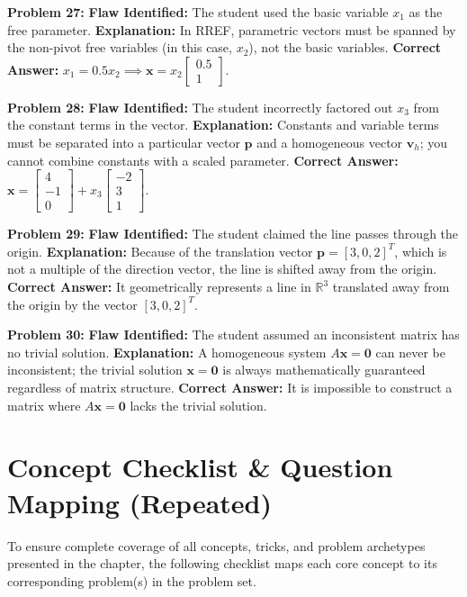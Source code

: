 \documentclass[12pt]{article}
\begin{document}
\textbf{Problem 27:}
\textbf{Flaw Identified:} The student used the basic variable $x_1$ as the free parameter.
\textbf{Explanation:} In RREF, parametric vectors must be spanned by the non-pivot free variables (in this case, $x_2$), not the basic variables.
\textbf{Correct Answer:} $x_1 = 0.5x_2 \implies \mathbf{x} = x_2 \begin{bmatrix} 0.5 \\ 1 \end{bmatrix}$.

\textbf{Problem 28:}
\textbf{Flaw Identified:} The student incorrectly factored out $x_3$ from the constant terms in the vector.
\textbf{Explanation:} Constants and variable terms must be separated into a particular vector $\mathbf{p}$ and a homogeneous vector $\mathbf{v}_h$; you cannot combine constants with a scaled parameter.
\textbf{Correct Answer:} $\mathbf{x} = \begin{bmatrix} 4 \\ -1 \\ 0 \end{bmatrix} + x_3 \begin{bmatrix} -2 \\ 3 \\ 1 \end{bmatrix}$.

\textbf{Problem 29:}
\textbf{Flaw Identified:} The student claimed the line passes through the origin.
\textbf{Explanation:} Because of the translation vector $\mathbf{p} = [3, 0, 2]^T$, which is not a multiple of the direction vector, the line is shifted away from the origin.
\textbf{Correct Answer:} It geometrically represents a line in $\mathbb{R}^3$ translated away from the origin by the vector $[3, 0, 2]^T$.

\textbf{Problem 30:}
\textbf{Flaw Identified:} The student assumed an inconsistent matrix has no trivial solution.
\textbf{Explanation:} A homogeneous system $A\mathbf{x} = \mathbf{0}$ can never be inconsistent; the trivial solution $\mathbf{x} = \mathbf{0}$ is always mathematically guaranteed regardless of matrix structure.
\textbf{Correct Answer:} It is impossible to construct a matrix where $A\mathbf{x} = \mathbf{0}$ lacks the trivial solution.

\newpage

\section{Concept Checklist \& Question Mapping (Repeated)}
To ensure complete coverage of all concepts, tricks, and problem archetypes presented in the chapter, the following checklist maps each core concept to its corresponding problem(s) in the problem set.
\end{document}
